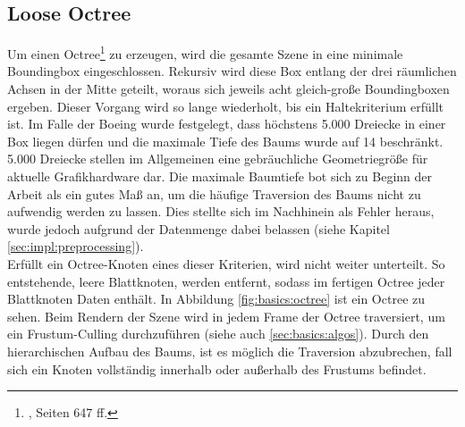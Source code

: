 \subsection{Loose Octree}
\label{sec:basics:octree}
Um einen Octree\footnote{\cite{RTR3}, Seiten 647 ff.} zu erzeugen, wird die gesamte Szene in eine minimale Boundingbox eingeschlossen. Rekursiv wird diese Box entlang der drei räumlichen Achsen in der Mitte geteilt, woraus sich jeweils acht gleich-große Boundingboxen ergeben. Dieser Vorgang wird so lange wiederholt, bis ein Haltekriterium erfüllt ist. Im Falle der Boeing wurde festgelegt, dass höchstens 5.000 Dreiecke in einer Box liegen dürfen und die maximale Tiefe des Baums wurde auf 14 beschränkt. 5.000 Dreiecke stellen im Allgemeinen eine gebräuchliche Geometriegröße für aktuelle Grafikhardware dar. Die maximale Baumtiefe bot sich zu Beginn der Arbeit als ein gutes Maß an, um die häufige Traversion des Baums nicht zu aufwendig werden zu lassen. Dies stellte sich im Nachhinein als Fehler heraus, wurde jedoch aufgrund der Datenmenge dabei belassen (siehe Kapitel \ref{sec:impl:preprocessing}).\\
Erfüllt ein Octree-Knoten eines dieser Kriterien, wird nicht weiter unterteilt. So entstehende, leere Blattknoten, werden entfernt, sodass im fertigen Octree jeder Blattknoten Daten enthält. In Abbildung \ref{fig:basics:octree} ist ein Octree zu sehen. Beim Rendern der Szene wird in jedem Frame der Octree traversiert, um ein Frustum-Culling durchzuführen (siehe auch \ref{sec:basics:algos}). Durch den hierarchischen Aufbau des Baums, ist es möglich die Traversion abzubrechen, fall sich ein Knoten vollständig innerhalb oder außerhalb des Frustums befindet.

